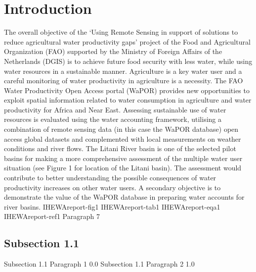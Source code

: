 \documentclass{article}%
\begin{document}
%
%
\cleardoublepage%
\clearpage%
%
\setcounter{page}{1}%
\pagestyle{SectionHeader}%
\newpage%
\RaggedRight%
\section{Introduction}%
\label{sec:Introduction}%
The overall objective of the ‘Using Remote Sensing in support of solutions to reduce agricultural water productivity gaps’ project of the Food and Agricultural Organization (FAO) supported by the Ministry of Foreign Affairs of the Netherlands (DGIS) is to achieve future food security with less water, while using water resources in a sustainable manner. Agriculture is a key water user and a careful monitoring of water productivity in agriculture is a necessity. The FAO Water Productivity Open Access portal (WaPOR) provides new opportunities to exploit spatial information related to water consumption in agriculture and water productivity for Africa and Near East. Assessing sustainable use of water resources is evaluated using the water accounting framework, utilising a combination of remote sensing data (in this case the WaPOR database) open access global datasets and complemented with local measurements on weather conditions and river flows.%
\linebreak%
The Litani River basin is one of the selected pilot basins for making a more comprehensive assessment of the multiple water user situation (see Figure 1 for location of the Litani basin). The assessment would contribute to better understanding the possible consequences of water productivity increases on other water users. A secondary objective is to demonstrate the value of the WaPOR database in preparing water accounts for river basins.%
\linebreak%
IHEWAreport{-}fig1%
\linebreak%
IHEWAreport{-}tab1%
\linebreak%
IHEWAreport{-}eqa1%
\linebreak%
IHEWAreport{-}ref1%
\linebreak%
Paragraph 7%
\linebreak%
\subsection{Subsection 1.1}%
\label{subsec:Subsection1.1}%
Subsection 1.1 Paragraph 1 0.0%
\linebreak%
Subsection 1.1 Paragraph 2 1.0%
\linebreak
\end{document}
